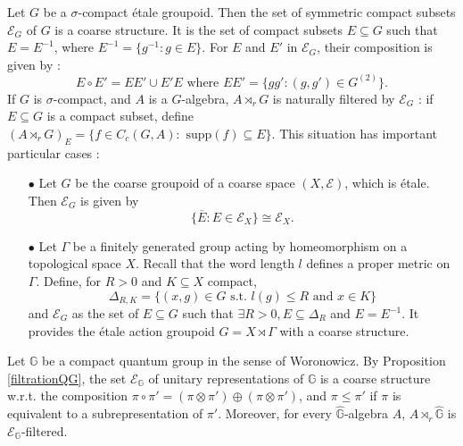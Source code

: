 \begin{Expl}
Let $G$ be a $\sigma$-compact étale groupoid. Then the set of symmetric compact subsets $\mathcal E_G$ of $G$ is a coarse structure. It is the set of compact subsets $E\subseteq G$ such that $E=E^{-1}$, where $E^{-1} = \{g^{-1} : g\in E\}$. For $E$ and $E'$ in $\mathcal E_G$, their composition is given by :
\[E\circ E' = EE' \cup E'E \text{ where }EE' = \{gg' : (g,g')\in G^{(2)}\}.\] 
If $G$ is $\sigma$-compact, and $A$ is a $G$-algebra, $A\rtimes_r G$ is naturally filtered by $\mathcal E_G$ : if $E\subseteq G$ is a compact subset, define $(A\rtimes_r G)_E = \{f\in C_c(G,A) : \text{ supp}(f)\subseteq E\}$. This situation has important particular cases :
\begin{itemize}
\item[$\bullet$] Let $G$ be the coarse groupoid of a coarse space $(X,\mathcal E)$, which is étale. Then $\mathcal E_G$ is given by \[\{\overline{E} : E\in\mathcal E_X\} \cong \mathcal E_X.\] 
\item[$\bullet$] Let $\Gamma$ be a finitely generated group acting by homeomorphism on a topological space $X$. Recall that the word length $l$ defines a proper metric on $\Gamma$. Define, for $R>0$ and $K\subseteq X$ compact, 
\[\Delta_{R,K} = \{(x,g)\in G \text{ s.t. } l(g)\leq R \text{ and } x\in K\}\] 
and $\mathcal E_G $ as the set of $E\subseteq G$ such that $\exists R>0, E\subseteq \Delta_R$ and $E = E^{-1}$. It provides the étale action groupoid $G=X\rtimes \Gamma$ with a coarse structure.
\end{itemize}
\end{Expl}

\begin{Expl}\label{EQG}
Let $\mathbb G$ be a compact quantum group in the sense of Woronowicz. By Proposition \ref{filtrationQG}, the set $\mathcal E_{\mathbb G}$ of unitary representations of $\mathbb G$ is a coarse structure w.r.t. the composition $\pi\circ \pi'=(\pi\otimes \pi')\oplus (\pi\otimes \pi')$, and $\pi\leq\pi'$ if $\pi$ is equivalent to a subrepresentation of $\pi'$. Moreover, for every $\hat{\mathbb G}$-algebra $A$,  $A\rtimes_r \hat{\mathbb G}$ is $\mathcal E_{\mathbb G}$-filtered.
\end{Expl}


